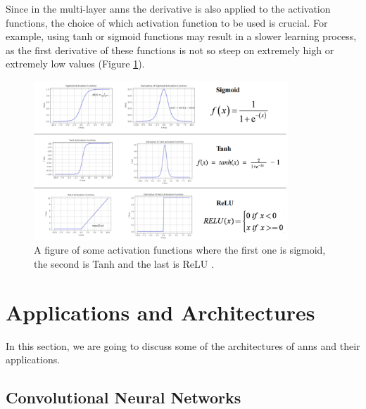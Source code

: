 \documentclass[runningheads]{llncs}
\begin{document}
Since in the multi-layer \gls{anns} the derivative is also applied to the activation functions,
the choice of which activation function to be used is crucial. For example, using 
tanh or sigmoid functions may result in a slower learning process, as the first derivative of these functions
is not so steep on extremely high or extremely low values (Figure \ref{actfig}).

\begin{figure}[H]
    \label{actfig}
    \centering
    \includegraphics[height=6cm]{actfig}
    \caption{A figure of some activation functions where the first one is sigmoid, the second is Tanh and the last is ReLU \cite{sdc}.}
\end{figure}



\section{Applications and Architectures}

In this section, we are going to discuss some of the architectures of \gls{anns}
and their applications.

\subsection{Convolutional Neural Networks}
\end{document}
